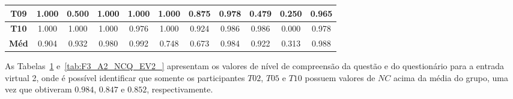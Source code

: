 \begin{table}[htbp]
\begin{tabular}{|c|cccccccccc|}
		\textbf{T09}                                             & \multicolumn{1}{c|}{1.000}                               & \multicolumn{1}{c|}{0.500}                               & \multicolumn{1}{c|}{1.000}                               & \multicolumn{1}{c|}{1.000}                               & \multicolumn{1}{c|}{1.000}                               & \multicolumn{1}{c|}{0.875}                               & \multicolumn{1}{c|}{0.978}                               & \multicolumn{1}{c|}{0.479}                               & \multicolumn{1}{c|}{0.250}                               & 0.965        \\ \hline
		\rowcolor[HTML]{F2F2F2} 
		\textbf{T10}                                             & \multicolumn{1}{c|}{\cellcolor[HTML]{F2F2F2}1.000}       & \multicolumn{1}{c|}{\cellcolor[HTML]{F2F2F2}1.000}       & \multicolumn{1}{c|}{\cellcolor[HTML]{F2F2F2}1.000}       & \multicolumn{1}{c|}{\cellcolor[HTML]{F2F2F2}0.976}       & \multicolumn{1}{c|}{\cellcolor[HTML]{F2F2F2}1.000}       & \multicolumn{1}{c|}{\cellcolor[HTML]{F2F2F2}0.924}       & \multicolumn{1}{c|}{\cellcolor[HTML]{F2F2F2}0.986}       & \multicolumn{1}{c|}{\cellcolor[HTML]{F2F2F2}0.986}       & \multicolumn{1}{c|}{\cellcolor[HTML]{F2F2F2}0.000}       & 0.978        \\ \hline
		\cellcolor[HTML]{F2F2F2}\textbf{Méd}                     & \multicolumn{1}{c|}{0.904}                               & \multicolumn{1}{c|}{0.932}                               & \multicolumn{1}{c|}{0.980}                               & \multicolumn{1}{c|}{0.992}                               & \multicolumn{1}{c|}{0.748}                               & \multicolumn{1}{c|}{0.673}                               & \multicolumn{1}{c|}{0.984}                               & \multicolumn{1}{c|}{0.922}                               & \multicolumn{1}{c|}{0.313}                               & 0.988        \\ \hline
	\end{tabular}
	\label{tab:F3_A2_NCQ_EV2}
\end{table}

As Tabelas~\ref{tab:F3_A2_NCQ_EV2} e~\ref{tab:F3_A2_NCQ_EV2_} apresentam os valores de nível de compreensão da questão e do questionário para a entrada virtual 2, onde é possível identificar que somente os participantes $T02$, $T05$ e $T10$ possuem valores de $NC$ acima da média do grupo, uma vez que obtiveram $0.984$, $0.847$ e $0.852$, respectivamente.

